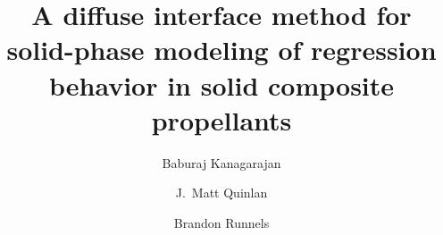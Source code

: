 \documentclass[colorinlistoftodos,review]{elsarticle}
\makeatletter
\renewcommand{\todo}[2][]{\@todo[caption={#2}, #1]{\begin{spacing}{0.5}#2\end{spacing}}} %
\newcommand{\brandon}[1]{\todo[color=C0]{BR: #1}}
\makeatother
\begin{document}

\begin{frontmatter}

  \title{A diffuse interface method for solid-phase modeling of regression behavior in solid composite propellants}
  \author{Baburaj Kanagarajan}
  \author{J.~Matt Quinlan}
  \author{Brandon Runnels}
  \address{Department of Mechanical and Aerospace Engineering, University of Colorado, Colorado Springs, CO USA}


\end{frontmatter}
\end{document}
